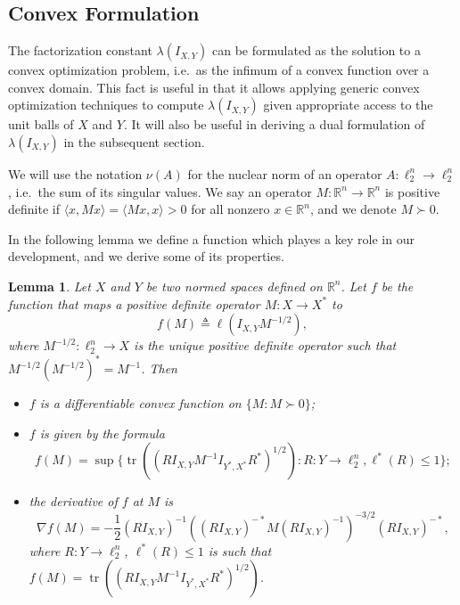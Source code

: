 \documentclass{article}
\newtheorem{lemma}{Lemma}
\newcommand{\R}{{\mathbb{R}}}
\newcommand{\eqdef}{\triangleq}
\DeclareMathOperator{\tr}{tr}
\begin{document}
\subsection{Convex Formulation}

The factorization constant $\lambda(I_{X,Y})$ can be formulated as the
solution to a convex optimization problem, i.e.~as the infimum of a
convex function over a convex domain. This fact is useful in that it
allows applying generic convex optimization techniques to compute
$\lambda(I_{X,Y})$ given appropriate access to the unit balls of $X$
and $Y$. It will also be useful in deriving a dual formulation of
$\lambda(I_{X,Y})$ in the subsequent section. 

We will use the notation $\nu(A)$ for the nuclear norm of an operator
$A:\ell_2^n \to \ell_2^n$, i.e.~the sum of its singular values. We say
an operator $M:\R^n \to \R^n$ is positive definite if $\langle x,
Mx\rangle = \langle Mx, x\rangle > 0$ for all nonzero $x \in \R^n$,
and we denote $M \succ 0$.  


In the following lemma we define a
function which playes a key role in our development, and we derive
some of its properties.

\begin{lemma}\label{lm:obj-f}
  Let $X$ and $Y$ be two normed spaces defined on $\R^n$. Let $f$ be
  the function that maps a positive definite operator $M: X \to X^*$
  to
  \[
  f(M) \eqdef  \ell(I_{X,Y}M^{-1/2}),
  \]
  where $M^{-1/2}:\ell_2^n \to X$ is the unique positive definite operator such that
  $M^{-1/2}(M^{-1/2})^* = M^{-1}$. Then
  \begin{itemize}
  \item $f$ is a differentiable convex function on $\{M: M \succ 0\}$;
  \item $f$ is given by the formula
    \begin{equation}\label{eq:f-formula}
    f(M) = \sup\{\tr((RI_{X,Y}M^{-1}I_{Y^*,X^*}R^*)^{1/2}): 
    R: Y \to \ell_2^n, \ell^*(R) \le 1\};
    \end{equation}
  \item the derivative of $f$ at $M$ is 
    \begin{equation}\label{eq:f-derivative}
    \nabla f(M) = 
    -\frac{1}{2} (RI_{X,Y})^{-1} ((RI_{X,Y})^{-*} M (RI_{X,Y})^{-1})^{-3/2} (RI_{X,Y})^{-*},
    \end{equation}
    where $R: Y \to \ell_2^n$, $\ell^*(R) \le 1$ is such that $f(M) = 
    \tr((RI_{X,Y}M^{-1}I_{Y^*,X^*}R^*)^{1/2})$.
  \end{itemize}
\end{lemma}
\end{document}
